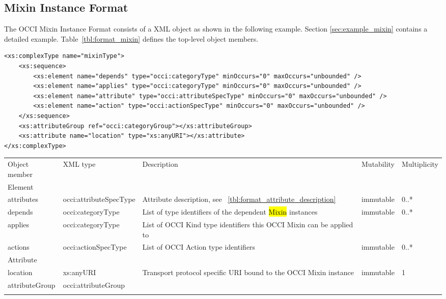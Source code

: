 \documentclass[10pt,a4paper]{article}
\begin{document}
\subsection{Mixin Instance Format}
\label{sec:format_mixin}

The OCCI Mixin Instance Format consists of a XML object as shown in the following example. Section \ref{sec:example_mixin} contains a detailed example.
Table~\ref{tbl:format_mixin} defines the top-level object members.
\begin{lstlisting}
<xs:complexType name="mixinType">
	<xs:sequence>
		<xs:element name="depends" type="occi:categoryType" minOccurs="0" maxOccurs="unbounded" />
		<xs:element name="applies" type="occi:categoryType" minOccurs="0" maxOccurs="unbounded" />
		<xs:element name="attribute" type="occi:attributeSpecType" minOccurs="0" maxOccurs="unbounded" />
		<xs:element name="action" type="occi:actionSpecType" minOccurs="0" maxOccurs="unbounded" />
	</xs:sequence>
	<xs:attributeGroup ref="occi:categoryGroup"></xs:attributeGroup>
	<xs:attribute name="location" type="xs:anyURI"></xs:attribute>
</xs:complexType>
\end{lstlisting}

 {
    \begin{tabularx}{\textwidth}{llXll}
    \toprule
    Object member & XML type & Description & Mutability & Multiplicity \\
    \colrule
    Element \\
    attributes & occi:attributeSpecType & Attribute description, see
~\ref{tbl:format_attribute_description} & immutable & 0..* \\

    depends & occi:categoryType & List of type identifiers of the dependent
 \hl{Mixin} instances & immutable & 0..* \\
 
    applies & occi:categoryType & List of OCCI Kind type identifiers this OCCI 
Mixin can be applied to \\

    actions & occi:actionSpecType & List of OCCI Action type identifiers
& immutable & 0..* \\

    Attribute \\
    location & xs:anyURI & Transport protocol specific URI bound to the OCCI Mixin
instance & immutable & 1 \\

    attributeGroup & occi:attributeGroup & & & \\
    \botrule
    \end{tabularx}
}
\end{document}
